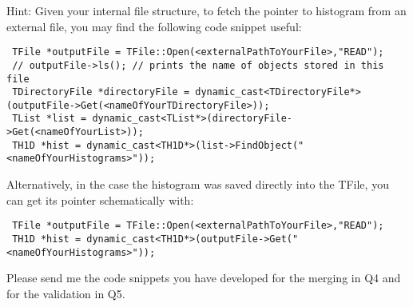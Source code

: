 \documentclass[11pt]{article}
\begin{document}
\vspace{0.1044cm}

\noindent Hint: Given your internal file structure, to fetch the pointer to histogram from an external file, you may find the following code snippet useful:
%
{\footnotesize
\begin{verbatim}
 TFile *outputFile = TFile::Open(<externalPathToYourFile>,"READ");
 // outputFile->ls(); // prints the name of objects stored in this file
 TDirectoryFile *directoryFile = dynamic_cast<TDirectoryFile*>(outputFile->Get(<nameOfYourTDirectoryFile>));
 TList *list = dynamic_cast<TList*>(directoryFile->Get(<nameOfYourList>));
 TH1D *hist = dynamic_cast<TH1D*>(list->FindObject("<nameOfYourHistograms>"));
\end{verbatim}}

\noindent Alternatively, in the case the histogram was saved directly into the TFile, you can get its pointer schematically with:
%
{\footnotesize
\begin{verbatim}
 TFile *outputFile = TFile::Open(<externalPathToYourFile>,"READ");
 TH1D *hist = dynamic_cast<TH1D*>(outputFile->Get("<nameOfYourHistograms>"));
\end{verbatim}}


\noindent Please send me the code snippets you have developed for the merging in Q4 and for the validation in Q5. 
\end{document}
